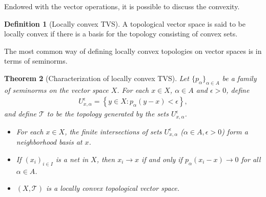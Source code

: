 \documentclass{article}
\numberwithin{equation}{section}
\renewcommand{\cal}{\mathcal}
\theoremstyle{plain}
\newtheorem{theorem}{Theorem}[section]
\theoremstyle{definition}
\newtheorem{definition}[theorem]{Definition}
\begin{document}
Endowed with the vector operations, it is possible to discuss the convexity.
\begin{definition}[Locally convex TVS]
A topological vector space is said to be locally convex if there is a basis for the topology consisting of convex sets.
\end{definition}
The most common way of defining locally convex topologies on vector spaces is in terms of seminorms.
\begin{theorem}[Characterization of locally convex TVS]\label{lctvschar}
Let $\{p_\alpha\}_{\alpha\in A}$ be a family of seminorms on the vector space $X$. For each $x\in X$, $\alpha\in A$ and $\epsilon>0$, define
\begin{align*}
	U_{x,\alpha}^\epsilon=\left\{y\in X:p_\alpha(y-x)<\epsilon\right\},
\end{align*} 
and define $\cal{T}$ to be the topology generated by the sets $U_{x,\alpha}^\epsilon$.
\begin{itemize}
\item[(i)] For each $x\in X$, the finite intersections of sets $U_{x,\alpha}^\epsilon$ ($\alpha\in A,\epsilon>0$) form a neighborhood basis at $x$.
\item[(ii)] If $(x_i)_{i\in I}$ is a net in $X$, then $x_i\to x$ if and only if $p_\alpha(x_i-x)\to 0$ for all $\alpha\in A$.
\item[(iii)] $(X,\cal{T})$ is a locally convex topological vector space.
\end{itemize}
\end{theorem}
\end{document}
